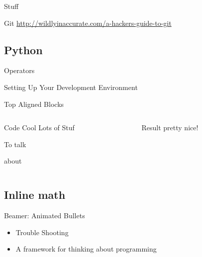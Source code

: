\documentclass[presentation]{beamer}
\begin{document}
Stuff



\begin{frame}[label=sec-7-0-1]{Git}
\url{http://wildlyinaccurate.com/a-hackers-guide-to-git}
\end{frame}

\subsection{Python}
\label{sec-7-1}
\begin{frame}[label=sec-7-1-1]{Operators}
\end{frame}

\begin{frame}[label=sec-7-1-2]{Setting Up Your Development Environment}
\end{frame}



\begin{frame}[label=sec-8-0-1]{Top Aligned Blocks}
\begin{columns}
\begin{column}{0.5\textwidth}
\begin{block}{Code}
Cool
Lots
of Stuf

To talk

about
\end{block}
\end{column}

\begin{column}{0.5\textwidth}
\begin{block}{Result}
pretty nice!
\end{block}
\end{column}
\end{columns}
\end{frame}


\subsection{Inline math}
\label{sec-8-1}


\begin{frame}[label=sec-8-1-1]{Beamer: Animated Bullets}
\begin{itemize}[<+->]
\item Trouble Shooting
\item A framework for thinking about programming
\end{itemize}
\end{frame}
\end{document}
